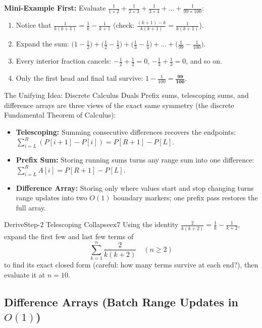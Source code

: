 \documentclass[11pt,a4paper]{article}
\theoremstyle{definition}
\newcommand{\examplebeat}{\textbf{\color{primaryblue}Mini-Example First:} }
\begin{document}
\examplebeat Evaluate $\frac{1}{1 \times 2} + \frac{1}{2 \times 3} + \frac{1}{3 \times 4} + \dots + \frac{1}{99 \times 100}$:
\begin{enumerate}
    \item Notice that $\frac{1}{k(k+1)} = \frac{1}{k} - \frac{1}{k+1}$ (check: $\frac{(k+1) - k}{k(k+1)} = \frac{1}{k(k+1)}$).
    \item Expand the sum: $\bigl(1 - \frac{1}{2}\bigr) + \bigl(\frac{1}{2} - \frac{1}{3}\bigr) + \bigl(\frac{1}{3} - \frac{1}{4}\bigr) + \dots + \bigl(\frac{1}{99} - \frac{1}{100}\bigr)$.
    \item Every interior fraction cancels: $-\frac{1}{2} + \frac{1}{2} = 0$, $-\frac{1}{3} + \frac{1}{3} = 0$, and so on.
    \item Only the first head and final tail survive: $1 - \frac{1}{100} = \mathbf{\frac{99}{100}}$.
\end{enumerate}

\begin{calloutbox}{The Unifying Idea: Discrete Calculus Duals}
Prefix sums, telescoping sums, and difference arrays are three views of the exact same symmetry (the discrete Fundamental Theorem of Calculus):
\begin{itemize}
    \item \textbf{Telescoping:} Summing consecutive differences recovers the endpoints: $\sum_{i=L}^{R} (P[i+1] - P[i]) = P[R+1] - P[L]$.
    \item \textbf{Prefix Sum:} Storing running sums turns any range sum into one difference: $\sum_{i=L}^{R} A[i] = P[R+1] - P[L]$.
    \item \textbf{Difference Array:} Storing only where values start and stop changing turns range updates into two $O(1)$ boundary markers; one prefix pass restores the full array.
\end{itemize}
\end{calloutbox}

\begin{tryitbox}{Derive}{Step-2 Telescoping Collapse}{ex7}
Using the identity $\frac{2}{k(k+2)} = \frac{1}{k} - \frac{1}{k+2}$, expand the first few and last few terms of
\[
    \sum_{k=1}^{n} \frac{2}{k(k+2)} \quad (n \ge 2)
\]
to find its exact closed form (careful: how many terms survive at each end?), then evaluate it at $n = 10$.
\end{tryitbox}

\subsection{\texorpdfstring{Difference Arrays (Batch Range Updates in $O(1)$)}{Difference Arrays (Batch Range Updates in O(1))}}
\end{document}
